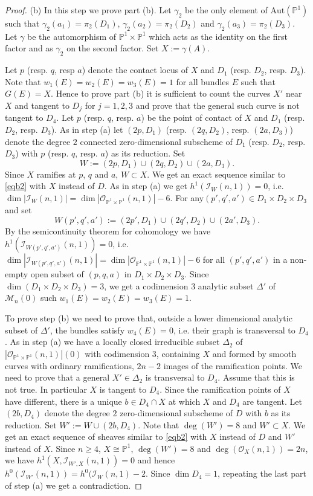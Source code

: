 \documentclass[10pt,a4paper]{amsart}
\theoremstyle{plain}
\theoremstyle{definition}
\theoremstyle{remark}
\begin{document}
\begin{proof}
 (b) In this step we prove part (b). Let $\gamma_2$ be the only element of  $\mathrm{Aut}(\mathbb P^1)$ such that $\gamma_2(a_1)=\pi_2(D_1)$, $\gamma_2(a_2)= \pi_2(D_2)$ and $\gamma_2(a_3)=\pi_2(D_3)$. Let $\gamma$ be the automorphism of $\mathbb P^1\times \mathbb P^1$ which acts as the identity on the first factor and as $\gamma_2$ on the second factor. Set $X:= \gamma(A)$. 
 
 Let $p$ (resp. $q$, resp $a$) denote the contact locus of $X$ and $D_1$ (resp. $D_2$, resp. $D_3$). Note that $w_1(E)=w_2(E)=w_3(E)=1$ for all bundles $E$ such that $G(E)=X$. Hence to prove part (b) it is sufficient to count the curves $X'$ near $X$ and tangent to $D_j$ for $j=1,2,3$ and prove that the general such curve is not tangent to $D_4$. Let $p$ (resp. $q$, resp. $a$) be the point of contact of $X$ and $D_1$ (resp. $D_2$, resp. $D_3$). As in step (a) let $(2p,D_1)$ (resp. $(2q,D_2)$, resp. $(2a,D_3)$) denote the degree $2$ connected zero-dimensional subscheme of $D_1$ (resp. $D_2$, resp. $D_3$) with $p$ (resp. $q$, resp. $a$) as its reduction. Set 
 $$W:= (2p,D_1)\cup (2q,D_2)\cup(2a,D_3).$$ 
 Since $X$ ramifies at $p$, $q$ and $a$, $W\subset X$. We get an exact sequence similar to \eqref{eqb2} with $X$ instead of $D$.
As in step (a) we get $h^1(\mathcal I_W(n,1)) =0$, i.e. $\dim |\mathcal I_W(n,1)| =\dim |\mathcal O_{\mathbb P^1\times \mathbb P^1}(n,1)|-6$. For any$(p',q',a')\in D_1\times D_2\times D_3$ and set 
$$W(p',q',a'):= (2p',D_1)\cup (2q',D_2)\cup(2a',D_3).$$ By the semicontinuity theorem for cohomology  \cite[Th. III.13.8]{h} we have  $h^1(\mathcal I_{W(p',q',a')}(n,1)) =0$, i.e. $\dim |\mathcal I_{W(p',q',a')}(n,1)| =\dim |\mathcal O_{\mathbb P^1\times \mathbb P^1}(n,1)|-6$ for all $(p',q',a')$ in a non-empty open subset of $(p,q,a)$ in  $D_1\times D_2\times D_3$. Since $\dim (D_1\times D_2\times D_3)=3$, we get
a codimension $3$ analytic subset $\Delta'$ of $\mathcal M_n(0)$ such $w_1(E)=w_2(E)=w_3(E)=1$. 

To prove step (b) we need to prove that, outside a lower dimensional analytic subset of $\Delta'$, the bundles satisfy $w_4(E)=0$, i.e. their graph is transversal to $D_4$. As in step (a) we have a locally closed irreducible subset $\Delta_2$ of $|\mathcal O_{\mathbb P^1\times \mathbb P^1}(n,1)|(0)$ with codimension $3$, containing $X$ and formed by smooth curves with ordinary ramifications, $2n-2$ images of the ramification points. We need to prove that a general $X'\in \Delta_2$ is transversal to $D_4$. Assume that this is not true. In particular $X$ is tangent to $D_4$. Since the ramification points of $X$ have different, there is a unique $b\in D_4\cap X$ at which $X$ and $D_4$ are tangent.
Let $(2b,D_4)$ denote the degree $2$ zero-dimensional subscheme of $D$ with $b$ as its reduction. Set $W':= W\cup (2b,D_4)$.
Note that $\deg(W')=8$ and $W'\subset X$. We get an exact sequence of sheaves similar to \eqref{eqb2} with $X$ instead of $D$ and $W'$ instead of $X$.
Since $n\ge 4$, $X\cong \mathbb P^1$, $\deg(W')=8$ and $\deg(\mathcal O_X(n,1)) =2n$, we have $h^1(X,\mathcal I_{W',X}(n,1)) =0$ and hence
$h^0(\mathcal I_{W'}(n,1)) =h^0(\mathcal I_W(n,1)-2$. Since $\dim D_4 =1$, repeating the last part of step (a) we get a contradiction.
\end{proof}
\end{document}
